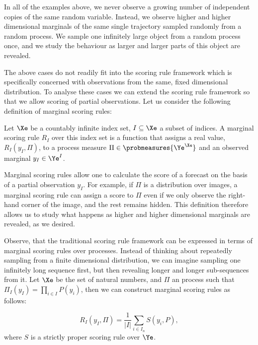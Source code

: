In all of the examples above, we never observe a growing number of independent copies of the same random variable. Instead, we observe higher and higher dimensional marginals of the same single trajectory sampled randomly from a random process. We sample one infinitely large object from a random process once, and we study the behaviour as larger and larger parts of this object are revealed.

The above cases do not readily fit into the scoring rule framework which is specifically concerned with \iid observations from the same, fixed dimensional distribution. To analyse these cases we can extend the scoring rule framework so that we allow scoring of partial observations. Let us consider the following definition of marginal scoring rules:

\begin{definition}
Let $\Xe$ be a countably infinite index set, $I\subseteq\Xe$ a subset of indices. A marginal scoring rule $R_I$ over this index set is a function that assigns a real value, $R_{I}(y_{I},\Pi)$,  to a process measure $\Pi\in\probmeasures{\Ye^{\Xe}}$ and an observed marginal $y_{I}\in\Ye^{I}$.
\end{definition}

Marginal scoring rules allow one to calculate the score of a forecast on the basis of a partial observation $y_{I}$. For example, if $\Pi$ is a distribution over images, a marginal scoring rule can assign a score to $\Pi$ even if we only observe the right-hand corner of the image, and the rest remains hidden. This definition therefore allows us to study what happens as higher and higher dimensional marginals are revealed, as we desired.

Observe, that the traditional \iid scoring rule framework can be expressed in terms of marginal scoring rules over \iid processes. Instead of thinking about repeatedly sampling from a finite dimensional distribution, we can imagine sampling one infinitely long sequence first, but then revealing longer and longer sub-sequences from it. Let $\Xe$ be the set of natural numbers, and $\Pi$ an \iid process such that $\Pi_{I}(y_{I}) = \prod_{i\in I} P(y_i)$, then we can construct marginal scoring rules as follows:

\begin{equation}
R_{I}(y_{I},\Pi) = \frac{1}{\vert I \vert} \sum_{i\in I_n} S(y_i,P)\label{eqn:decompose},
\end{equation}
where $S$ is a strictly proper scoring rule over $\Ye$.

